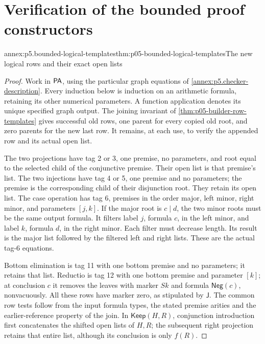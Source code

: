 \section{Verification of the bounded proof constructors}
\label{sec:annex-p05-pa-bounded-proof-builders}

\begin{annexitem}{annex:p5.bounded-logical-templates}{thm:p05-bounded-logical-templates}{The new logical rows and their exact open lists}
\begin{proof}
Work in \(\mathsf{PA}\), using the particular graph equations of
\cref{annex:p5.checker-description}. Every induction below is induction
on an arithmetic formula, retaining its other numerical parameters. A
function application denotes its unique specified graph output. The joining
invariant of \cref{thm:p05-builder-row-templates} gives successful old rows,
one parent for every copied old root, and zero parents for the new last row.
It remains, at each use, to verify the appended row and its actual open list.

The two projections have tag 2 or 3, one premise, no parameters, and root
equal to the selected child of the conjunctive premise. Their open list is
that premise's list. The two injections have tag 4 or 5, one premise and
no parameters; the premise is the corresponding child of their disjunction
root. They retain its open list. The case operation has tag 6, premises in
the order major, left minor, right minor, and parameters \([j,k]\).
If the major root is \(c\mathbin{|}d\), the two minor roots must be the
same output formula. It filters label \(j\), formula \(c\), in the
left minor, and label \(k\), formula \(d\), in the right minor. Each
filter must decrease length. Its result is the major list followed by the
filtered left and right lists. These are the actual tag-6 equations.

Bottom elimination is tag 11 with one bottom premise and no parameters;
it retains that list. Reductio is tag 12 with one bottom premise and
parameter \([k]\); at conclusion \(c\) it removes the leaves with
marker \(Sk\) and formula \(\mathsf{Neg}(c)\), nonvacuously.
All these rows have marker zero, as stipulated by \(\mathsf J\).
The common row tests follow from the input formula types, the stated
premise arities and the earlier-reference property of the join. In
\(\mathsf{Keep}(H,R)\), conjunction introduction first concatenates the
shifted open lists of \(H,R\); the subsequent right projection retains
that entire list, although its conclusion is only \(f(R)\).


\end{proof}
\end{annexitem}
